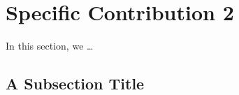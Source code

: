 \documentclass[../techreport.tex]{subfiles}
\begin{document}
\section{Specific Contribution 2}
\label{sec:specific2}
In this section, we \ldots
\subsection{A Subsection Title}
\end{document}
